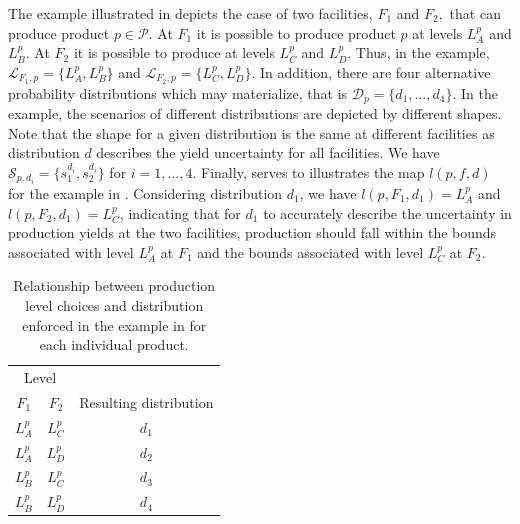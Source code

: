 \documentclass[12pt]{article}
\theoremstyle{thmstylethree}%
\begin{document}
The example illustrated in  depicts the case of two facilities,  $F_1$ and $F_2,$ that can produce product $p\in\mathcal{P}$. At $F_1$ it is possible to produce product $p$ at levels $L^p_A$ and $L^p_B$. At $F_2$ it is possible to produce at levels $L^p_C$ and $L^p_D$. Thus, in the example, $\mathcal{L}_{F_1,p}=\{L^p_A,L^p_B\}$ and $\mathcal{L}_{F_2,p}=\{L^p_C,L^p_D\}$. 
In addition, there are four alternative probability distributions which may materialize, that is $\mathcal{D}_p=\{d_1,\ldots,d_4\}$.  In the example, the scenarios of different distributions are depicted by different shapes. Note that the shape for a given distribution is the same at different facilities as distribution $d$ describes the yield uncertainty for all facilities. We have $\mathcal{S}_{p,d_i}=\{s_1^{d_i},s_2^{d_i}\}$ for $i=1,\ldots,4$. 
Finally,  serves to illustrates the map $l(p,f,d)$ for the example in .
Considering distribution $d_1$, we have $l(p,F_1,d_1)=L^p_A$ and $l(p,F_2,d_1) = L^p_C$, indicating that for $d_1$ to accurately describe the uncertainty in production yields at the two facilities, production should fall within the bounds associated with level $L_{A}^{p}$ at $F_1$ and the bounds associated with level $L_{C}^{p}$ at $F_2.$
\color{black}

\begin{table}
    \caption{Relationship between production level choices and distribution enforced in the example in  for each individual product.}
    \label{tab:example2}
    \centering
    \begin{tabular}{cc|c}
    \toprule
    \multicolumn{2}{c}{Level}\\
         $F_1$&$F_2$& Resulting distribution  \\
         \midrule
         $L^p_A$&$L^p_C$&$d_1$  \\
         $L^p_A$&$L^p_D$&$d_2$  \\
         $L^p_B$&$L^p_C$&$d_3$  \\
         $L^p_B$&$L^p_D$&$d_4$  \\
         \bottomrule
    \end{tabular}
\end{table}
\end{document}
